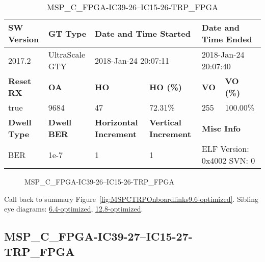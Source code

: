 \begin{table}[h]
\centering
\caption{MSP\_C\_FPGA-IC39-26--IC15-26-TRP\_FPGA}
\label{tab:MSPCFPGAIC3926IC1526TRPFPGA9.6-optimized}
\begin{tabular}{@{}|l|l|l|l|l|l|@{}}
\toprule
\textbf{SW Version}                & \textbf{GT Type}   & \multicolumn{2}{l|}{\textbf{Date and Time Started}}            & \multicolumn{2}{l|}{\textbf{Date and Time Ended}}        \\ \midrule
2017.2                       & UltraScale GTY          & \multicolumn{2}{l|}{2018-Jan-24 20:07:11}                   & \multicolumn{2}{l|}{2018-Jan-24 20:07:40}               \\ \midrule
\textbf{Reset RX}                  & \textbf{OA} & \textbf{HO}   & \textbf{HO (\%)} & \textbf{VO} & \textbf{VO (\%)} \\ \midrule
true & 9684        & 47          & 72.31\%        & 255        & 100.00\%       \\ \midrule
\textbf{Dwell Type}                & \textbf{Dwell BER} & \textbf{Horizontal Increment} & \textbf{Vertical Increment}    & \multicolumn{2}{l|}{\textbf{Misc Info}}                  \\ \midrule
BER                            & 1e-7        & 1        & 1           & \multicolumn{2}{l|}{ELF Version: 0x4002 SVN: 0}                         \\ \bottomrule
\end{tabular}
\end{table}

\begin{figure}[h]
\caption{MSP\_C\_FPGA-IC39-26--IC15-26-TRP\_FPGA} \label{fig:MSPCFPGAIC3926IC1526TRPFPGA9.6-optimized}
\end{figure}

Call back to summary Figure~\ref{fig:MSPCTRPOnboardlinks9.6-optimized}.
Sibling eye diagrams: \hyperref[sec:MSPCFPGAIC3926IC1526TRPFPGA6.4-optimized]{6.4-optimized}, \hyperref[sec:MSPCFPGAIC3926IC1526TRPFPGA12.8-optimized]{12.8-optimized}.

\clearpage
\newpage


\subsection{MSP\_C\_FPGA-IC39-27--IC15-27-TRP\_FPGA}\label{sec:MSPCFPGAIC3927IC1527TRPFPGA9.6-optimized}

